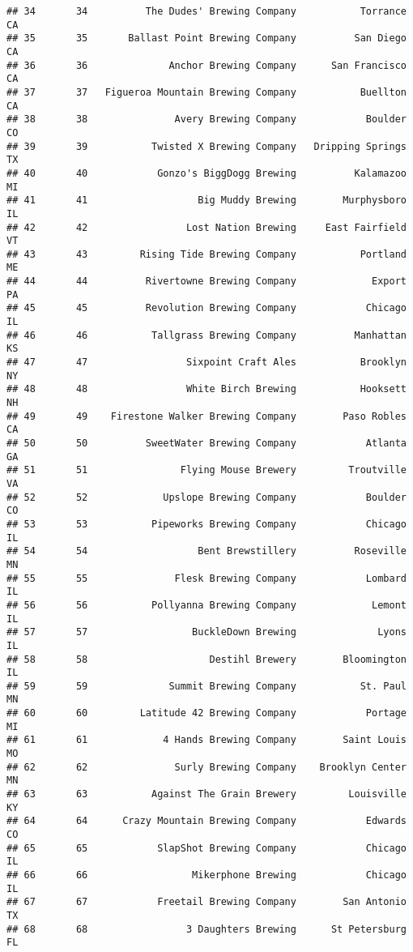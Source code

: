 \documentclass[
]{article}
\begin{document}
\begin{verbatim}
## 34       34          The Dudes' Brewing Company           Torrance    CA
## 35       35       Ballast Point Brewing Company          San Diego    CA
## 36       36              Anchor Brewing Company      San Francisco    CA
## 37       37   Figueroa Mountain Brewing Company           Buellton    CA
## 38       38               Avery Brewing Company            Boulder    CO
## 39       39           Twisted X Brewing Company   Dripping Springs    TX
## 40       40            Gonzo's BiggDogg Brewing          Kalamazoo    MI
## 41       41                   Big Muddy Brewing        Murphysboro    IL
## 42       42                 Lost Nation Brewing     East Fairfield    VT
## 43       43         Rising Tide Brewing Company           Portland    ME
## 44       44          Rivertowne Brewing Company             Export    PA
## 45       45          Revolution Brewing Company            Chicago    IL
## 46       46           Tallgrass Brewing Company          Manhattan    KS
## 47       47                 Sixpoint Craft Ales           Brooklyn    NY
## 48       48                 White Birch Brewing           Hooksett    NH
## 49       49    Firestone Walker Brewing Company        Paso Robles    CA
## 50       50          SweetWater Brewing Company            Atlanta    GA
## 51       51                Flying Mouse Brewery         Troutville    VA
## 52       52             Upslope Brewing Company            Boulder    CO
## 53       53           Pipeworks Brewing Company            Chicago    IL
## 54       54                   Bent Brewstillery          Roseville    MN
## 55       55               Flesk Brewing Company            Lombard    IL
## 56       56           Pollyanna Brewing Company             Lemont    IL
## 57       57                  BuckleDown Brewing              Lyons    IL
## 58       58                     Destihl Brewery        Bloomington    IL
## 59       59              Summit Brewing Company           St. Paul    MN
## 60       60         Latitude 42 Brewing Company            Portage    MI
## 61       61             4 Hands Brewing Company        Saint Louis    MO
## 62       62               Surly Brewing Company    Brooklyn Center    MN
## 63       63           Against The Grain Brewery         Louisville    KY
## 64       64      Crazy Mountain Brewing Company            Edwards    CO
## 65       65            SlapShot Brewing Company            Chicago    IL
## 66       66                  Mikerphone Brewing            Chicago    IL
## 67       67            Freetail Brewing Company        San Antonio    TX
## 68       68                 3 Daughters Brewing      St Petersburg    FL

\end{verbatim}
\end{document}
